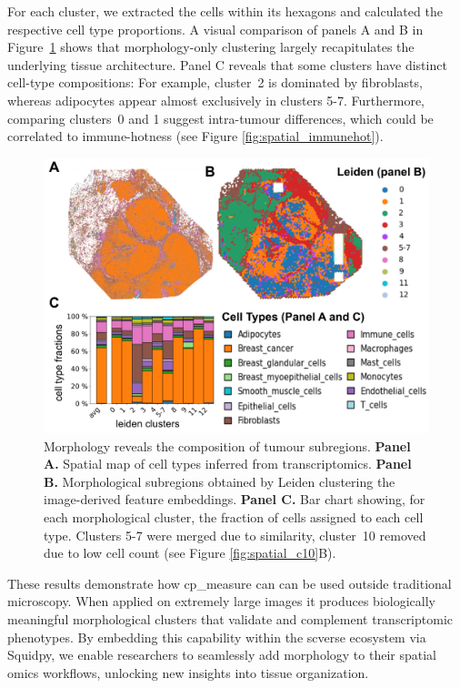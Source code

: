 \documentclass{article}
\begin{document}
For each cluster, we extracted the cells within its hexagons and calculated the respective cell type proportions. A visual comparison of panels A and B in Figure~\ref{fig:spatial_omics} shows that morphology-only clustering largely recapitulates the underlying tissue architecture. Panel C reveals that some clusters have distinct cell-type compositions: For example, cluster~2 is dominated by fibroblasts, whereas adipocytes appear almost exclusively in clusters 5-7. Furthermore, comparing clusters~0 and 1 suggest intra-tumour differences, which could be correlated to immune-hotness (see Figure \ref{fig:spatial_immunehot}).

\begin{figure}[htbp]
\centering
\includegraphics[width=.99\linewidth]{./figs/fig_4_spatial.png}
\caption{\label{fig:spatial_omics}{}Morphology reveals the composition of tumour subregions. \textbf{Panel A.} Spatial map of cell types inferred from transcriptomics. \textbf{Panel B.} Morphological subregions obtained by Leiden clustering the image-derived feature embeddings. \textbf{Panel C.} Bar chart showing, for each morphological cluster, the fraction of cells assigned to each cell type. Clusters 5-7 were merged due to similarity, cluster~10 removed due to low cell count (see Figure \ref{fig:spatial_c10}B).}
\end{figure}


These results demonstrate how cp\_measure can can be used outside traditional microscopy. When applied on extremely large images it produces biologically meaningful morphological clusters that validate and complement transcriptomic phenotypes. By embedding this capability within the scverse ecosystem via Squidpy, we enable researchers to seamlessly add morphology to their spatial omics workflows, unlocking new insights into tissue organization.
\end{document}
